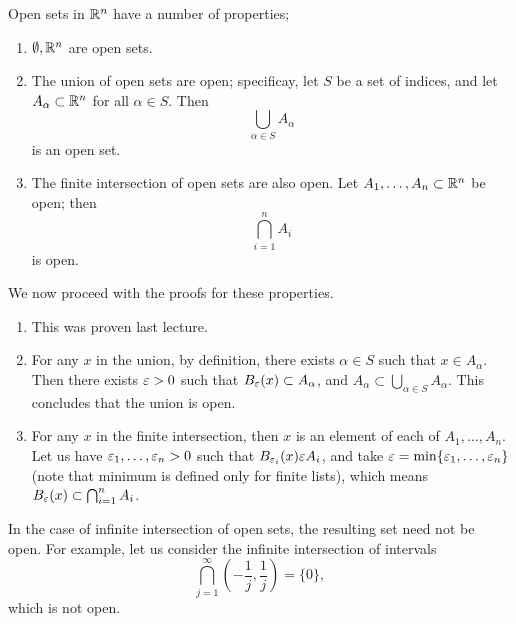 \noindent Open sets in $\mathbb R^n$ have a number of properties;
\begin{enumerate}[label=(\alph*)]
    \item $\emptyset, \mathbb R^n$ are open sets.
    \item The union of open sets are open; specificay, let $S$ be a set of indices, and let $A_\alpha \subset \mathbb R^n$ for all $\alpha \in S$. Then
    \[ \bigcup_{\alpha \in S} A_\alpha \]
    is an open set.
    \item The finite intersection of open sets are also open. Let $A_1, \dots, A_n \subset \mathbb R^n$ be open; then
    \[ \bigcap_{i=1}^n A_i \]
    is open. 
\end{enumerate}
We now proceed with the proofs for these properties.
\begin{enumerate}[label=(\alph*)]
    \item This was proven last lecture.
    \item For any $x$ in the union, by definition, there exists $\alpha \in S$ such that $x \in A_\alpha$. Then there exists $\varepsilon > 0$ such that $B_\varepsilon(x) \subset A_\alpha$, and $A_\alpha \subset \bigcup_{\alpha \in S} A_\alpha$. This concludes that the union is open.
    \item For any $x$ in the finite intersection, then $x$ is an element of each of $A_1, \dots, A_n$. Let us have $\varepsilon_1, \dots, \varepsilon_n > 0$ such that $B_{\varepsilon_i}(x) \varepsilon A_i$, and take $\varepsilon = \min\{\varepsilon_1, \dots, \varepsilon_n\}$ (note that minimum is defined only for finite lists), which means $B_\varepsilon(x) \subset \bigcap_{i=1}^n A_i$.
\end{enumerate}

\newpage
\noindent In the case of infinite intersection of open sets, the resulting set need not be open. For example, let us consider the infinite intersection of intervals
\[ \bigcap_{j=1}^\infty \left( -\frac{1}{j}, \frac{1}{j} \right) = \{0\}, \] 
which is not open.

